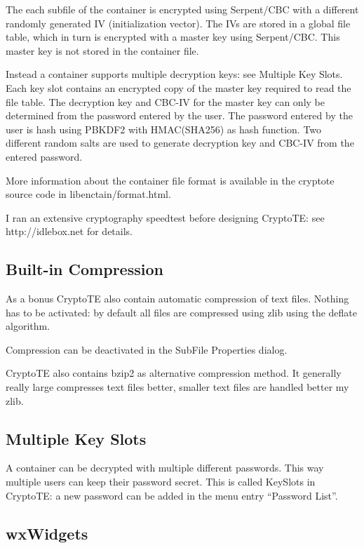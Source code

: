 \documentclass[a4paper,12pt,twoside]{article}
\begin{document}
The each subfile of the container is encrypted using Serpent/CBC with a different randomly generated IV (initialization vector). The IVs are stored in a global file table, which in turn is encrypted with a master key using Serpent/CBC. This master key is not stored in the container file.

Instead a container supports multiple decryption keys: see Multiple Key Slots. Each key slot contains an encrypted copy of the master key required to read the file table. The decryption key and CBC-IV for the master key can only be determined from the password entered by the user. The password entered by the user is hash using PBKDF2 with HMAC(SHA256) as hash function. Two different random salts are used to generate decryption key and CBC-IV from the entered password.

More information about the container file format is available in the cryptote source code in libenctain/format.html.

I ran an extensive cryptography speedtest before designing CryptoTE: see http://idlebox.net for details.

\subsection{Built-in Compression}\label{Compression}

As a bonus CryptoTE also contain automatic compression of text files. Nothing has to be activated: by default all files are compressed using zlib using the deflate algorithm.

Compression can be deactivated in the SubFile Properties dialog.

CryptoTE also contains bzip2 as alternative compression method. It generally really large compresses text files better, smaller text files are handled better my zlib.

\subsection{Multiple Key Slots}\label{KeySlots}

A container can be decrypted with multiple different passwords. This way multiple users can keep their password secret. This is called KeySlots in CryptoTE: a new password can be added in the menu entry ``Password List''.

\subsection{wxWidgets}\label{wxWidgets}
\end{document}
